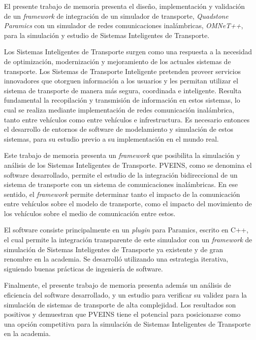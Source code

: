 El presente trabajo de memoria presenta el diseño, implementación y validación de un \emph{framework} de integración de un simulador de transporte, \emph{Quadstone Paramics} con un simulador de redes comunicaciones inalámbricas, \emph{OMNeT++}, para la simulación y estudio de Sistemas Inteligentes de Transporte.

Los Sistemas Inteligentes de Transporte surgen como una respuesta a la necesidad de optimización, modernización y mejoramiento de los actuales sistemas de transporte. Los Sistemas de Transporte Inteligente pretenden proveer servicios innovadores que otorguen información a los usuarios y les permitan utilizar el sistema de transporte de manera más segura, coordinada e inteligente. Resulta fundamental la recopilación y transmisión de información en estos sistemas, lo cual se realiza mediante implementación de redes comunicación inalámbrica, tanto entre vehículos como entre vehículos e infrestructura. Es necesario entonces el desarrollo de entornos de software de modelamiento y simulación de estos sistemas, para su estudio previo a su implementación en el mundo real.

Este trabajo de memoria presenta un \emph{framework} que posibilita la simulación y análisis de los Sistemas Inteligentes de Transporte. PVEINS, como se denomina el software desarrollado, permite el estudio de la integración bidireccional de un sistema de transporte con un sistema de comunicaciones inalámbricas. En ese sentido, el \emph{framework} permite determinar tanto el impacto de la comunicación entre vehículos sobre el modelo de transporte, como el impacto del movimiento de los vehículos sobre el medio de comunicación entre estos.

El software consiste principalmente en un \emph{plugin} para Paramics, escrito en C++, el cual permite la integración transparente de este simulador con un \emph{framework} de simulación de Sistemas Inteligentes de Transporte ya existente y de gran renombre en la academia. Se desarrolló utilizando una estrategia iterativa, siguiendo buenas prácticas de ingeniería de software.

Finalmente, el presente trabajo de memoria presenta además un análisis de eficiencia del software desarrollado, y un estudio para verificar su validez para la simulación de sistemas de transporte de alta complejidad. Los resultados son positivos y demuestran que PVEINS tiene el potencial para posicionarse como una opción competitiva para la simulación de Sistemas Inteligentes de Transporte en la academia. 
